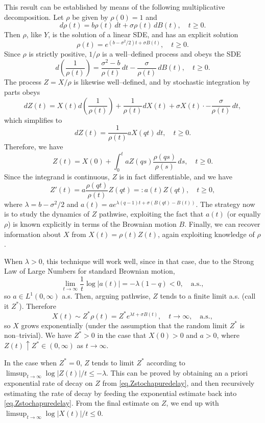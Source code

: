 \documentclass[a4paper,10pt,reqno]{amsart}
\numberwithin{equation}{section}
\theoremstyle{definition}
\theoremstyle{remark}
\DeclareMathOperator{\1}{\mathbbm 1}
\begin{document}
This result can be established by means of the following multiplicative decomposition. Let 
$\rho$ be given by $\rho(0)=1$ and 
\[
d\rho(t)=b\rho(t)\,dt + \sigma \rho(t)\,dB(t), \quad t\geq 0.
\]
Then $\rho$, like $Y$, is the solution of a linear SDE, and has an explicit solution 
\[
\rho(t) = e^{(b-\sigma^2/2)t+\sigma B(t)}, \quad t\geq 0.
\]
Since $\rho$ is strictly positive, $1/\rho$ is a well--defined process and obeys the SDE
\[
d\left(\frac{1}{\rho(t)}\right) = \frac{\sigma^2-b}{\rho(t)}\,dt -\frac{\sigma}{\rho(t)}\,dB(t), \quad t\geq 0.
\]
The process $Z=X/\rho$ is likewise 
well--defined, and by stochastic integration by parts obeys 
\[
dZ(t)=X(t)d\left(\frac{1}{\rho(t)}\right)+\frac{1}{\rho(t)}dX(t)+\sigma X(t)\cdot -\frac{\sigma}{\rho(t)}\,dt,
\]
which simplifies to 
\[
dZ(t)=\frac{1}{\rho(t)}aX(qt)\,dt,\quad t\geq 0.
\]
Therefore, we have 
\[
Z(t)=X(0)+\int_0^t a Z(qs) \frac{\rho(qs)}{\rho(s)}\,ds, \quad t\geq 0.
\]
Since the integrand is continuous, $Z$ is in fact differentiable, and we have 
\begin{equation} \label{eq.Zstochapuredelay}
Z'(t)= a \frac{\rho(qt)}{\rho(t)}Z(qt)=:a(t)Z(qt), \quad t\geq 0,
\end{equation}
where $\lambda=b-\sigma^2/2$ and $a(t)=a  e^{\lambda (q - 1) t+\sigma(B(qt)-B(t))}$. 
The strategy now is to study the dynamics of $Z$ pathwise, exploiting the fact that $a(t)$ (or equally $\rho$) is known explicitly in terms of the Brownian motion $B$. Finally, we can recover information about $X$ from $X(t)=\rho(t)Z(t)$, again exploiting knowledge of $\rho$. 

When $\lambda>0$, this technique will work well, since in that case, due to the Strong Law of Large Numbers for standard Brownian motion, 
\[
\lim_{t\to\infty} \frac{1}{t}\log |a(t)| = -\lambda(1-q)<0, \quad \text{a.s.},
\]
so 
$a\in L^1(0,\infty)$ a.s. Then, arguing pathwise, $Z$ tends to a finite limit a.s. (call it $Z^\ast$). Therefore 
\[
X(t)\sim Z^\ast \rho(t) = Z^\ast e^{\lambda t+\sigma B(t)}, \quad  t\to\infty, \quad \text{a.s.}, 
\]
so $X$ grows exponentially (under the assumption that the random limit $Z^\ast$ is non--trivial). We have $Z^\ast>0$ in the case that $X(0)>0$ and $a>0$, where $Z(t)\uparrow Z^\ast\in (0,\infty)$ as $t\to\infty$. 

In the case when $Z^\ast=0$, $Z$ tends to  limit $Z^\ast$ according to $\limsup_{t\to\infty} \log|Z(t)|/t\leq -\lambda$. This can be proved by obtaining an a priori exponential rate of decay on $Z$ from \eqref{eq.Zstochapuredelay}, and then recursively estimating the rate of decay by feeding the exponential estimate back into \eqref{eq.Zstochapuredelay}. From the final estimate on $Z$, we end up with $\limsup_{t\to\infty} \log|X(t)|/t\leq 0$. 
\end{document}
